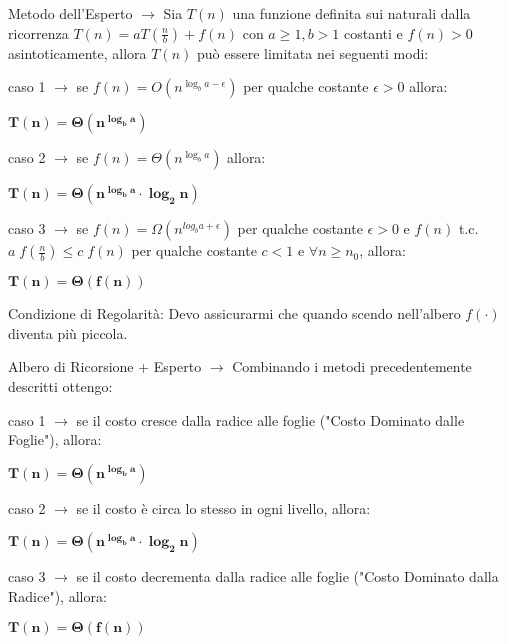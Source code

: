 \documentclass[8pt]{extarticle}
\begin{document}
\begin{formulario}
\begin{descr}{1}
\item[Metodo dell'Esperto] $\rightarrow$ Sia $T(n)$ una funzione definita sui naturali dalla ricorrenza $T(n)=aT(\frac{n}{b})+f(n)$ con $a\geq 1, b>1$ costanti e $f(n)>0$ asintoticamente, allora $T(n)$ può essere limitata nei seguenti modi:
			\begin{descr}{0}
\item[caso 1]$\rightarrow$ se $f(n)=O(n^{\log_b a-\epsilon})$ per qualche costante $\epsilon>0$ allora: 
				\begin{tcenter}
$\mathbf{T(n)=\Theta(n^{\log_b a})}$
				\end{tcenter} 
\item[caso 2]$\rightarrow$ se $f(n)=\Theta(n^{\log_b a})$ allora:
				\begin{tcenter}
$\mathbf{T(n)=\Theta(n^{\log_b a}\cdot \log_2 n)}$
				\end{tcenter}
\item[caso 3]$\rightarrow$ se $f(n)=\Omega(n^{log_b a+\epsilon})$ per qualche costante $\epsilon>0$ e $f(n)$ t.c. $a\;f(\frac{n}{b})\leq c\;f(n)$ per qualche costante $c<1$ e $\forall n\geq n_0$, allora:
				\begin{tcenter}
$\mathbf{T(n)=\Theta(f(n))}$
				\end{tcenter}
\item[Condizione di Regolarità:]
Devo assicurarmi che quando scendo nell'albero $f(\cdot)$ diventa più piccola.
			\end{descr}
\item[Albero di Ricorsione + Esperto]$\rightarrow$ Combinando i metodi precedentemente descritti ottengo:
			\begin{descr}{0}
\item[caso 1]$\rightarrow$ se il costo cresce dalla radice alle foglie ("Costo Dominato dalle Foglie"), allora:
				\begin{tcenter}
$\mathbf{T(n)=\Theta(n^{\log_b a})}$
				\end{tcenter}
\item[caso 2]$\rightarrow$ se il costo è circa lo stesso in ogni livello, allora:
				\begin{tcenter}
$\mathbf{T(n)=\Theta(n^{\log_b a}\cdot\log_2 n)}$
				\end{tcenter}
\item[caso 3]$\rightarrow$ se il costo decrementa dalla radice alle foglie ("Costo Dominato dalla Radice"), allora: 
				\begin{tcenter}
$\mathbf{T(n)=\Theta(f(n))}$
				\end{tcenter}
			\end{descr}
		\end{descr}
\myRule


\end{formulario}
\end{document}
